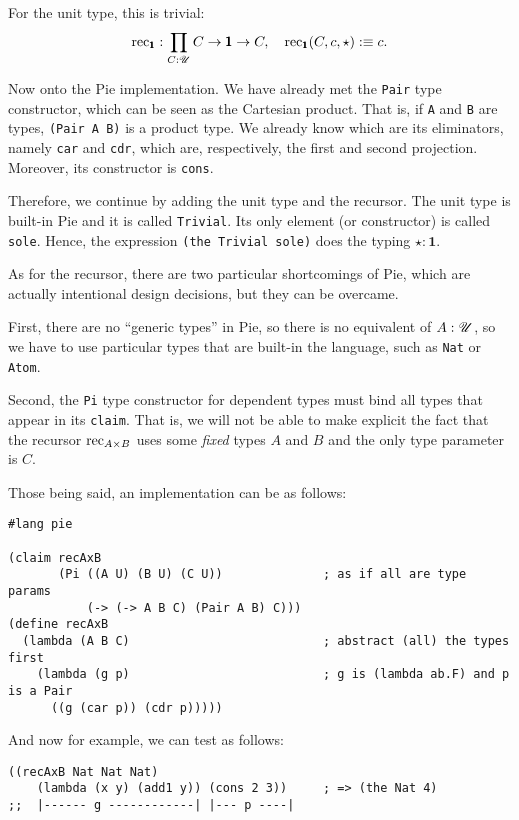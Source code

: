 For the unit type, this is trivial:
\[
  \dr{rec}_{\pmb{1}} : \prod_{C : \kal{U}} C \to \pmb{1} \to C, \quad %
  \dr{rec}_{\pmb{1}}(C, c, \star) :\equiv c.
\]

\vspace{0.3cm}

Now onto the Pie implementation. We have already met the \texttt{Pair} type
constructor, which can be seen as the Cartesian product. That is, if
\texttt{A} and \texttt{B} are types, \texttt{(Pair A B)} is a product
type. We already know which are its eliminators, namely \texttt{car} and
\texttt{cdr}, which are, respectively, the first and second projection.
Moreover, its constructor is \texttt{cons}.

Therefore, we continue by adding the unit type and the recursor.
The unit type is built-in Pie and it is called \texttt{Trivial}. Its
only element (or constructor) is called \texttt{sole}. Hence, the
expression \texttt{(the Trivial sole)} does the typing $ \star : \pmb{1} $.

As for the recursor, there are two particular shortcomings of Pie, which are
actually intentional design decisions\footnotemark, but they can be overcame.

First, there are no ``generic types'' in Pie, so there is no equivalent of
$ A : \mathscr{U} $, so we have to use particular types that are built-in the
language, such as \texttt{Nat} or \texttt{Atom}.

Second, the \texttt{Pi} type constructor for dependent types must bind
all types that appear in its \texttt{claim}. That is, we will not be able
to make explicit the fact that the recursor $ \mathrm{rec}_{A \times B} $ uses
some \emph{fixed} types $ A $ and $ B $ and the only type parameter is
$ C $.

Those being said, an implementation can be as follows:
{
  \small
\begin{verbatim}
#lang pie

(claim recAxB
       (Pi ((A U) (B U) (C U))              ; as if all are type params
           (-> (-> A B C) (Pair A B) C)))
(define recAxB
  (lambda (A B C)                           ; abstract (all) the types first
    (lambda (g p)                           ; g is (lambda ab.F) and p is a Pair
      ((g (car p)) (cdr p)))))
\end{verbatim}
}

And now for example, we can test as follows:
{
  \small
\begin{verbatim}
((recAxB Nat Nat Nat) 
    (lambda (x y) (add1 y)) (cons 2 3))     ; => (the Nat 4)
;;  |------ g ------------| |--- p ----|
\end{verbatim}
}

